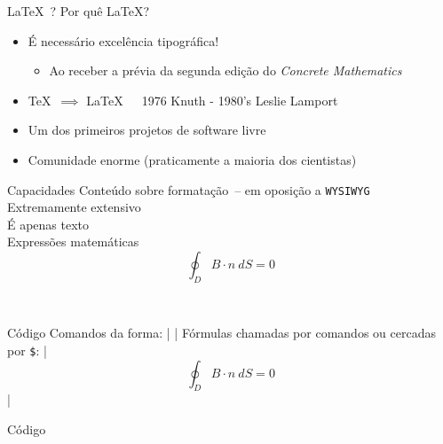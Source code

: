\documentclass{beamer}
\begin{document}
  \begin{frame}{\LaTeX\ ?}
    Por quê \LaTeX?\\\pause
    \begin{itemize}
      \item{\selectfont É necessário excelência tipográfica!\pause
        \begin{itemize}
          \item Ao receber a prévia da segunda edição do {\em Concrete Mathematics}\pause
        \end{itemize}}
      \item \TeX\ $\implies$ \LaTeX\ \ \ \scriptsize{1976 Knuth - 1980's Leslie Lamport}\pause
      \item Um dos primeiros projetos de software livre\pause
      \item Comunidade enorme (praticamente a maioria dos cientistas)
    \end{itemize}
  \end{frame}
  \begin{frame}[fragile]{Capacidades}
     Conteúdo sobre formatação\pause\ {\scriptsize-- em oposição a \texttt{WYSIWYG}}\\\pause
    \onslide<3>{$ \rightarrow $} Extremamente extensivo\\\pause
     É apenas texto\\\pause
     Expressões matemáticas\\\pause 
      $$ \oint_{D} B\cdot n\ dS = 0 $$
    \begin{center}
      \pause\href{doc/rogers}{}\\
      \pause\href{http://www.amazon.com/gp/product/1449314635}{}
    \end{center}
\end{frame}
  \begin{frame}[fragile]{Código}
    Comandos da forma: |  |\pause
    Fórmulas chamadas por comandos ou cercadas por {\texttt \$}: |$$ \oint_{D} B\cdot n\ dS = 0 $$|
\end{frame}
  \begin{frame}[fragile]{Código}
    \pause
\end{frame}
\end{document}
